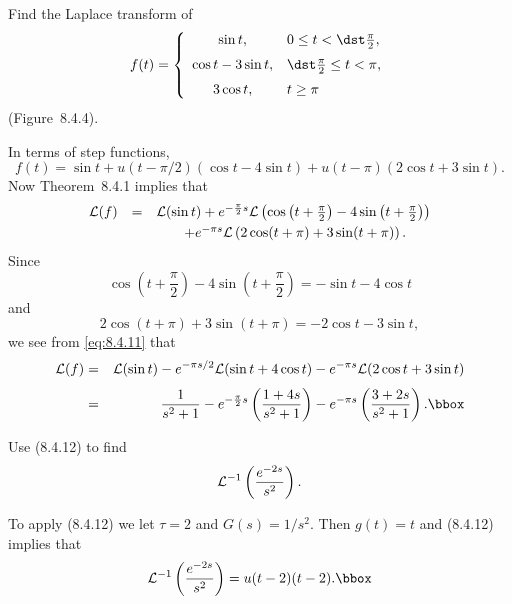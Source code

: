 \setcounter{example}{4}
\setcounter{equation}{9}
\begin{example}
  \label{example:8.4.5}\rm Find the Laplace transform of
  \begin{equation}
    \label{eq:8.4.10}f(t)=\left\{
    \begin{array}{cl}
      \sin t,         & 0\le t<\dst\frac{\pi}{2},   \\[2\jot]
      \cos t-3\sin t, & \dst\frac{\pi}{2}\le t<\pi, \\[2\jot]
      3\cos t,        & t\ge\pi
    \end{array}\right.
  \end{equation}
  (Figure~8.4.4).
\end{example}
\setcounter{equation}{10}
\begin{examplesolution}
\solution In terms of step functions,
\[
  f(t)=\sin t+u(t-\pi/2)(\cos t-4\sin t)+u(t-\pi)(2 \cos t+3\sin t).
\]
Now Theorem~8.4.1 implies that
\begin{equation}
  \label{eq:8.4.11}
  \begin{array}{ccl}
    {\cal L}(f) & = & {\cal L}(\sin t)+e^{-\frac{\pi}{2}s}{\cal L} \left(\cos\left(t+\frac{\pi}{2}\right)-4\sin\left(t+\frac{\pi}{2}\right)\right) \\
    [1\jot]     &   & \qquad+e^{-\pi s}{\cal L}\left(2\cos(t+\pi)+3\sin(t+\pi)\right).
  \end{array}
\end{equation}
Since
\[
  \cos\left(t+\frac{\pi}{2}\right)-4\sin\left(t+\frac{\pi}{2}\right)=-\sin t-4\cos t
\]
and
\[
  2\cos(t+\pi)+3\sin(t+\pi)=-2\cos t-3\sin t,
\]
we see from \eqref{eq:8.4.11} that
\begin{eqnarray*}
  {\cal L}(f) & = & {\cal L}(\sin t)-e^{-\pi s/2}{\cal L}(\sin t+4\cos t)-e^{-\pi s}{\cal L}(2\cos t+3\sin t) \\[1\jot]
              & = & \frac{1}{s^{2}+1}-e^{-\frac{\pi}{2}s}\left(\frac{1+4s}{s^{2}+1}\right)-e^{-\pi s}\left(\frac{3+2s}{s^{2}+1}\right).\bbox
\end{eqnarray*}
\end{examplesolution}

\setcounter{example}{5}
\begin{example}
  \label{example:8.4.6}\rm Use \textup{(8.4.12)} to find
  \[
    {\cal L}^{-1}\left(\frac{e^{-2s}}{s^{2}}\right).
  \]
\end{example}
\begin{examplesolution}
\solution To apply \textup{(8.4.12)} we let $\tau=2$ and $G(s)=1/s^{2}$. Then $g(t)=t$ and
\textup{(8.4.12)} implies that
\[
  {\cal L}^{-1}\left(\frac{e^{-2s}}{s^{2}}\right)=u(t-2)(t-2).\bbox
\]
\end{examplesolution}

